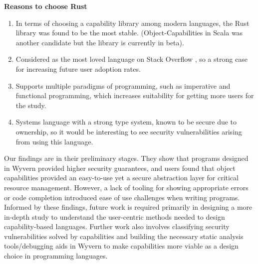 \noindent
\textbf{Reasons to choose Rust}
\begin{enumerate}
    \item In terms of choosing a capability library among modern languages, the Rust library was found to be the most stable. (Object-Capabilities in Scala \cite{scalaCaps} was another candidate but the library is currently in beta).
    \item Considered as the most loved language on Stack Overflow \cite{rustLove}, so a strong case for increasing future user adoption rates.
    \item Supports multiple paradigms of programming, such as imperative and functional programming, which increases suitability for getting more users for the study.
    \item Systems language with a strong type system, known to be secure due to ownership, so it would be interesting to see security vulnerabilities arising from using this language.
\end{enumerate}

Our findings are in their preliminary stages. They show that programs designed in Wyvern provided higher security guarantees, and users found that object capabilities provided an easy-to-use yet a secure abstraction layer for critical resource management. However, a lack of tooling for showing appropriate errors or code completion introduced ease of use challenges when writing programs. Informed by these findings, future work is required primarily in designing a more in-depth study to understand the user-centric methods needed to design capability-based languages. Further work also involves classifying security vulnerabilities solved by capabilities and building the necessary static analysis tools/debugging aids in Wyvern to make capabilities more viable as a design choice in programming languages.